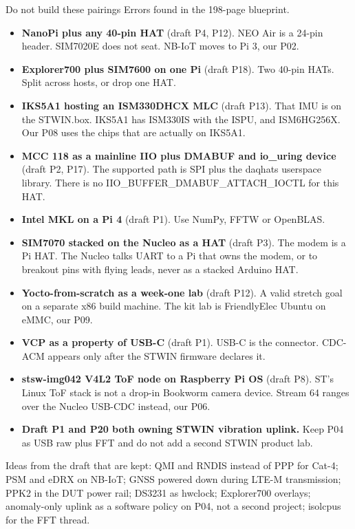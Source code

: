 \begin{rulebox}{Do not build these pairings}
Errors found in the 198-page blueprint.
\begin{itemize}
\item \textbf{NanoPi plus any 40-pin HAT} (draft P4, P12). NEO Air is a 24-pin header. SIM7020E does not seat. NB-IoT moves to Pi 3, our P02.
\item \textbf{Explorer700 plus SIM7600 on one Pi} (draft P18). Two 40-pin HATs. Split across hosts, or drop one HAT.
\item \textbf{IKS5A1 hosting an ISM330DHCX MLC} (draft P13). That IMU is on the STWIN.box. IKS5A1 has ISM330IS with the ISPU, and ISM6HG256X. Our P08 uses the chips that are actually on IKS5A1.
\item \textbf{MCC 118 as a mainline IIO plus DMABUF and io\_uring device} (draft P2, P17). The supported path is SPI plus the daqhats userspace library. There is no IIO\_BUFFER\_DMABUF\_ATTACH\_IOCTL for this HAT.
\item \textbf{Intel MKL on a Pi 4} (draft P1). Use NumPy, FFTW or OpenBLAS.
\item \textbf{SIM7070 stacked on the Nucleo as a HAT} (draft P3). The modem is a Pi HAT. The Nucleo talks UART to a Pi that owns the modem, or to breakout pins with flying leads, never as a stacked Arduino HAT.
\item \textbf{Yocto-from-scratch as a week-one lab} (draft P12). A valid stretch goal on a separate x86 build machine. The kit lab is FriendlyElec Ubuntu on eMMC, our P09.
\item \textbf{VCP as a property of USB-C} (draft P1). USB-C is the connector. CDC-ACM appears only after the STWIN firmware declares it.
\item \textbf{stsw-img042 V4L2 ToF node on Raspberry Pi OS} (draft P8). ST's Linux ToF stack is not a drop-in Bookworm camera device. Stream 64 ranges over the Nucleo USB-CDC instead, our P06.
\item \textbf{Draft P1 and P20 both owning STWIN vibration uplink.} Keep P04 as USB raw plus FFT and do not add a second STWIN product lab.
\end{itemize}
\end{rulebox}

Ideas from the draft that are kept: QMI and RNDIS instead of PPP for Cat-4; PSM and eDRX on NB-IoT; GNSS powered down during LTE-M transmission; PPK2 in the DUT power rail; DS3231 as hwclock; Explorer700 overlays; anomaly-only uplink as a software policy on P04, not a second project; isolcpus for the FFT thread.

